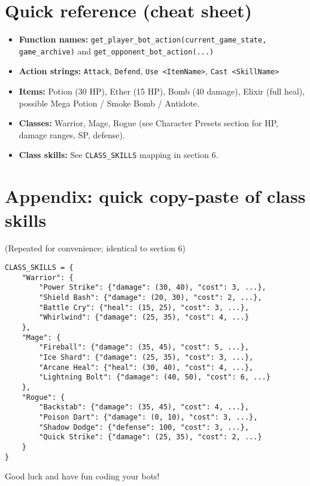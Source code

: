 \documentclass[11pt]{article}
\begin{document}
\section{Quick reference (cheat sheet)}
\begin{itemize}
  \item \textbf{Function names:} \texttt{get\_player\_bot\_action(current\_game\_state, game\_archive)} and \texttt{get\_opponent\_bot\_action(...)}
  \item \textbf{Action strings:} \texttt{Attack}, \texttt{Defend}, \texttt{Use <ItemName>}, \texttt{Cast <SkillName>}
  \item \textbf{Items:} Potion (30 HP), Ether (15 HP), Bomb (40 damage), Elixir (full heal), possible Mega Potion / Smoke Bomb / Antidote.
  \item \textbf{Classes:} Warrior, Mage, Rogue (see Character Presets section for HP, damage ranges, SP, defense).
  \item \textbf{Class skills:} See \texttt{CLASS\_SKILLS} mapping in section 6.
\end{itemize}

\section{Appendix: quick copy-paste of class skills}
(Repeated for convenience; identical to section 6)
\begin{lstlisting}
CLASS_SKILLS = {
    "Warrior": {
        "Power Strike": {"damage": (30, 40), "cost": 3, ...},
        "Shield Bash": {"damage": (20, 30), "cost": 2, ...},
        "Battle Cry": {"heal": (15, 25), "cost": 3, ...},
        "Whirlwind": {"damage": (25, 35), "cost": 4, ...}
    },
    "Mage": {
        "Fireball": {"damage": (35, 45), "cost": 5, ...},
        "Ice Shard": {"damage": (25, 35), "cost": 3, ...},
        "Arcane Heal": {"heal": (30, 40), "cost": 4, ...},
        "Lightning Bolt": {"damage": (40, 50), "cost": 6, ...}
    },
    "Rogue": {
        "Backstab": {"damage": (35, 45), "cost": 4, ...},
        "Poison Dart": {"damage": (0, 10), "cost": 3, ...},
        "Shadow Dodge": {"defense": 100, "cost": 3, ...},
        "Quick Strike": {"damage": (25, 35), "cost": 2, ...}
    }
}
\end{lstlisting}


\bigskip
\noindent Good luck and have fun coding your bots!
\end{document}
